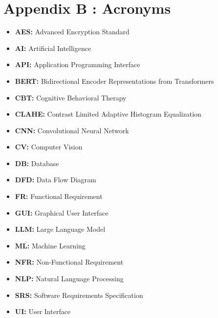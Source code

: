 \documentclass[11pt]{report}
\begin{document}
\chapter*{Appendix B : Acronyms}
\begin{itemize}
    \item \textbf{AES:} Advanced Encryption Standard
    \item \textbf{AI:} Artificial Intelligence
    \item \textbf{API:} Application Programming Interface
    \item \textbf{BERT:} Bidirectional Encoder Representations from Transformers
    \item \textbf{CBT:} Cognitive Behavioral Therapy
    \item \textbf{CLAHE:} Contrast Limited Adaptive Histogram Equalization
    \item \textbf{CNN:} Convolutional Neural Network
    \item \textbf{CV:} Computer Vision
    \item \textbf{DB:} Database
    \item \textbf{DFD:} Data Flow Diagram
    \item \textbf{FR:} Functional Requirement
    \item \textbf{GUI:} Graphical User Interface
    \item \textbf{LLM:} Large Language Model
    \item \textbf{ML:} Machine Learning
    \item \textbf{NFR:} Non-Functional Requirement
    \item \textbf{NLP:} Natural Language Processing
    \item \textbf{SRS:} Software Requirements Specification
    \item \textbf{UI:} User Interface
\end{itemize}
\end{document}
